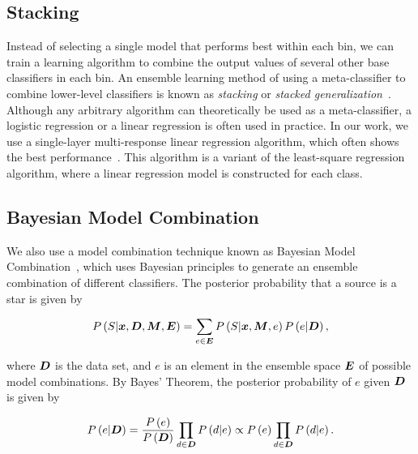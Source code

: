 \documentclass[useAMS,usenatbib]{mn2e}
\begin{document}
\subsection{Stacking}

Instead of selecting a single model that performs best within each bin,
we can train a learning algorithm to combine the output values of
several other base classifiers in each bin.
An ensemble learning method of using a meta-classifier
to combine lower-level classifiers is known as \textit{stacking}
or \textit{stacked generalization}~\citep{wolpert1992stacked}.
Although any arbitrary algorithm
can theoretically be used as a meta-classifier,
a logistic regression or a linear regression is often used
in practice.
In our work,
we use a single-layer multi-response linear regression algorithm,
which often shows the best performance~\citep{breiman1996stacked,
ting1999issues}. 
This algorithm
is a variant of the least-square regression algorithm,
where a linear regression model is constructed for each class.


\subsection{Bayesian Model Combination}

We also use a model combination technique known as
Bayesian Model Combination~\citep[BMC;][]{Monteith2011}, which
uses Bayesian principles to generate an ensemble combination of
different classifiers.
The posterior probability that a source is a star is given by

\begin{equation} \label{eq:p_star_bmc}
  P \left(S | \bmath{x}, \bmath{D}, \bmath{M}, \bmath{E} \right)
  = \sum_{e \in \bmath{E}} P \left(S | \bmath{x}, \bmath{M}, e \right)
  P \left(e | \bmath{D} \right),
\end{equation}

\noindent
where $\bmath{D}$ is the data set,
and $e$ is an element in the ensemble space $\bmath{E}$ of possible model combinations.
By Bayes' Theorem, the posterior probability of $e$ given $\bmath{D}$ is given by

\begin{equation} \label{eq:p_ensemble}
  P \left(e | \bmath{D} \right)
  = \frac{P \left(e \right)}{P \left(\bmath{D} \right)}
  \prod_{d \in \bmath{D}} P \left( d | e \right)
  \propto P \left(e\right) \prod_{d \in \bmath{D}} P \left(d | e \right).
\end{equation}
\end{document}
